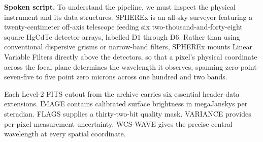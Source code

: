\documentclass[11pt,a4paper]{article}
\begin{document}
{}

\textbf{Spoken script.} To understand the pipeline, we must inspect the physical instrument and its data structures. SPHEREx is an all-sky surveyor featuring a twenty-centimeter off-axis telescope feeding six two-thousand-and-forty-eight square HgCdTe detector arrays, labelled D1 through D6. Rather than using conventional dispersive grisms or narrow-band filters, SPHEREx mounts Linear Variable Filters directly above the detectors, so that a pixel's physical coordinate across the focal plane determines the wavelength it observes, spanning zero-point-seven-five to five point zero microns across one hundred and two bands.

Each Level-2 FITS cutout from the archive carries six essential header-data extensions. IMAGE contains calibrated surface brightness in megaJanskys per steradian. FLAGS supplies a thirty-two-bit quality mask. VARIANCE provides per-pixel measurement uncertainty. WCS-WAVE gives the precise central wavelength at every spatial coordinate.
\end{document}
